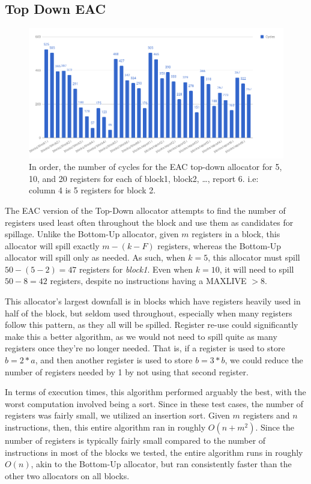 \documentclass[answers]{exam}
\begin{document}
	\subsection{Top Down EAC}
		\begin{figure}[H]
			\centering
			\includegraphics[scale=0.43]{s_cycles.png}
			\caption{In order, the number of cycles for the EAC top-down allocator for 5, 10, and 20 registers for each of block1, block2, \dots, report 6. i.e: column 4 is 5 registers for block 2.}
		\end{figure}
		
		The EAC version of the Top-Down allocator attempts to find the number of registers used least often throughout the block and use them as candidates for spillage. Unlike the Bottom-Up allocator, given $m$ registers in a block, this allocator will spill exactly $m - (k - F)$ registers, whereas the Bottom-Up allocator will spill only as needed. As such, when $k = 5$, this allocator must spill $50 - (5 - 2) = 47$ registers for \textit{block1}. Even when $k = 10$, it will need to spill $50 - 8 = 42$ registers, despite no instructions having a MAXLIVE $> 8$. 
		
		This allocator's largest downfall is in blocks which have registers heavily used in half of the block, but seldom used throughout, especially when many registers follow this pattern, as they all will be spilled. Register re-use could significantly make this a better algorithm, as we would not need to spill quite as many registers once they're no longer needed. That is, if a register is used to store $b = 2*a$, and then another register is used to store $b = 3*b$, we could reduce the number of registers needed by 1 by not using that second register. 
		
		In terms of execution times, this algorithm performed arguably the best, with the worst computation involved being a sort. Since in these test cases, the number of registers was fairly small, we utilized an insertion sort. Given $m$ registers and $n$ instructions, then, this entire algorithm ran in roughly $O(n + m^2)$. Since the number of registers is typically fairly small compared to the number of instructions in most of the blocks we tested, the entire algorithm runs in roughly $O(n)$, akin to the Bottom-Up allocator, but ran consistently faster than the other two allocators on all blocks. 
		
\end{document}

